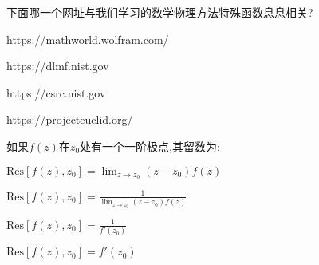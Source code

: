 \documentclass{njustexam}
\begin{document}






\begin{problem}
  下面哪一个网址与我们学习的数学物理方法特殊函数息息相关? 
  \begin{abcd}
    \item https://mathworld.wolfram.com/
    \item https://dlmf.nist.gov
    \item https://csrc.nist.gov
    \item https://projecteuclid.org/
  \end{abcd}

\end{problem}

\begin{problem}
  如果$f(z)$在$z_0$处有一个一阶极点,其留数为:
\begin{abcd}
  \item $\text{Res}[f(z), z_0] = \lim_{z \to z_0} (z - z_0)f(z)$
  \item $\text{Res}[f(z), z_0] = \frac{1}{\lim_{z \to z_0} (z - z_0)f(z)}$
  \item $\text{Res}[f(z), z_0] = \frac{1}{f'(z_0)}$
  \item $\text{Res}[f(z), z_0] = f'(z_0)$
\end{abcd}
\end{problem}







\end{document}
